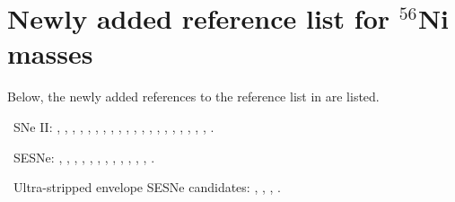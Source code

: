 \documentclass[twocolumn, linenumbers]{aastex62}
\begin{document}
\appendix

\section{Newly added reference list for $^{56}$Ni masses}
Below, the newly added references to the reference list in \citet{2019A&A...628A...7A} are listed.

\ SNe II:
\citet{2011A&A...532A.100U},
\citet{2018ApJ...862..107B},
\citet{2018PhDT.......126L},
\citet{2018MNRAS.480.2475S, 2019ApJ...882L..15S, 2019ApJ...882...68S},
\citet{2019ApJ...881...22A},
\citet{2019ApJ...885...43A},
\citet{2019MNRAS.487..832B},
\citet{2019MNRAS.490.1605D},
\citet{2019A&A...631A...8H},
\citet{2019A&A...629A.124M, 2020A&A...642A.143M},
\citet{2019A&A...629A..57M},
\citet{2019ApJ...880...59R},
\citet{2019ApJ...876...19S},
\citet{2019ApJ...875..136V},
\citet{2019MNRAS.485.5120B, 2020ApJ...895...31B},
\citet{2020MNRAS.496...95G, 2020MNRAS.499..974G},
\citet{2020MNRAS.496.3725J},
\citet{2020MNRAS.496.4517S},
\citet{2020MNRAS.497..361M},
\citet{2020MNRAS.494.5882R},
\citet{2020MNRAS.498...84Z}.

\ SESNe:
\citet{2017ApJ...835..140M},
\citet{2019MNRAS.487.5824A},
\citet{2019ApJ...878L...5F},
\citet{2019ApJ...887..169H, 2020ApJ...893..132H, 2020ApJ...902...86H},
\citet{2019ApJ...875...76N}, 
\citet{2018A&A...609A.106T, 2019A&A...621A..64T, 2019A&A...621A..71T}, 
\citet{2018MNRAS.478.4162P, 2019MNRAS.485.1559P, 2020MNRAS.499.1450P}, 
\citet{2019MNRAS.485.5438S},
\citet{2019ApJ...877...20W},
\citet{2019ApJ...871..176X},
\citet{2020MNRAS.497.1619M},
\citet{2020MNRAS.496.4517S},
\citet{2020A&A...634A..21S}.

\ Ultra-stripped envelope SESNe candidates:
\citet{2012ApJ...755..161K}
\citet{2018Sci...362..201D}, 
\citet{2018ApJ...866...72D},
\citet{2020ApJ...900...46Y},
\citet{2020A&A...635A.186P}.

\end{document}

